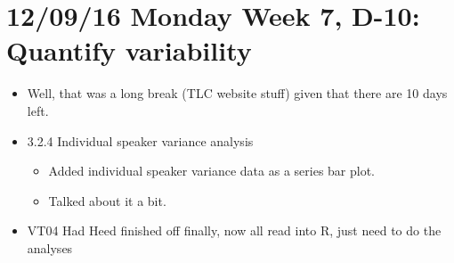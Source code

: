 \documentclass{article}
\begin{document}
\section*{12/09/16 Monday Week 7, D-10: Quantify variability}
\begin{itemize}
    \item Well, that was a long break (TLC website stuff) given that there are 10 days left.
    \item 3.2.4 Individual speaker variance analysis
    \begin{itemize}
        \item Added individual speaker variance data as a series bar plot.
        \item Talked about it a bit.
    \end{itemize}
    \item VT04 Had Heed finished off finally, now all read into R, just need to do the analyses
\end{itemize}
\end{document}
